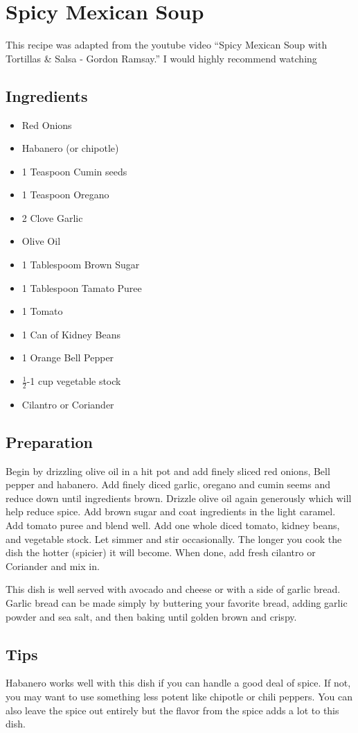 \thispagestyle{fancy}
\section{Spicy Mexican Soup}
\AddToShipoutPicture*{\MexicanSoup}
This recipe was adapted from the youtube video ``Spicy Mexican Soup with Tortillas \& Salsa - Gordon Ramsay.'' I would highly recommend watching 
\subsection*{Ingredients}
\begin{multicols}{3}
	\begin{itemize}
		\item Red Onions
		\item Habanero (or chipotle)
		\item 1 Teaspoon Cumin seeds
		\item 1 Teaspoon Oregano
		\item 2 Clove Garlic
		\item Olive Oil
		\item 1 Tablespoom Brown Sugar
		\item 1 Tablespoon Tamato Puree
		\item 1 Tomato
		\item 1 Can of Kidney Beans
		\item 1 Orange Bell Pepper
		\item $\frac{1}{2}$-1 cup vegetable stock
		\item Cilantro or Coriander
	\end{itemize}
\end{multicols}

\subsection*{Preparation}

Begin by drizzling olive oil in a hit pot and add finely sliced red onions, Bell pepper and habanero. Add finely diced garlic, oregano and cumin seems and reduce down until ingredients brown. Drizzle olive oil again generously which will help reduce spice. Add brown sugar and coat ingredients in the light caramel. Add tomato puree and blend well. Add one whole diced tomato, kidney beans, and vegetable stock. Let simmer and stir occasionally. The longer you cook the dish the hotter (spicier) it will become. When done, add fresh cilantro or Coriander and mix in. 

This dish is well served with avocado and cheese or with a side of garlic bread. Garlic bread can be made simply by buttering your favorite bread, adding garlic powder and sea salt, and then baking until golden brown and crispy. 

\subsection*{Tips}

Habanero works well with this dish if you can handle a good deal of spice. If not, you may want to use something less potent like chipotle or chili peppers. You can also leave the spice out entirely but the flavor from the spice adds a lot to this dish.